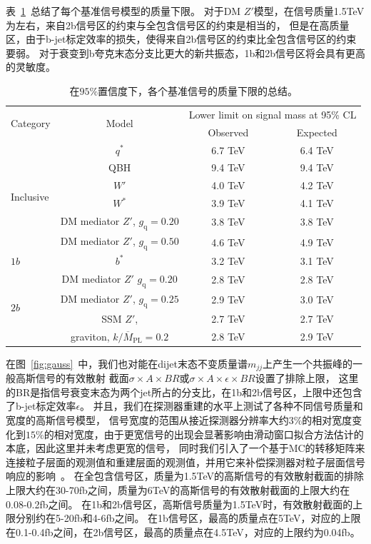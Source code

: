 表~\ref{tab:limits}~总结了每个基准信号模型的质量下限。
对于DM $Z'$模型，在信号质量1.5TeV为左右，来自2b信号区的约束与全包含信号区的约束是相当的，
但是在高质量区，由于b-jet标定效率的损失，使得来自2b信号区的约束比全包含信号区的约束要弱。
对于衰变到b夸克末态分支比更大的新共振态，1b和2b信号区将会具有更高的灵敏度。


\begin{table}[htbp]
  \caption{ 在$95\%$置信度下，各个基准信号的质量下限的总结。}
  \centering
  \begin{tabular}{l|c|c|c}
    \hline\hline
    \multirow{2}{*}{Category} & \multirow{2}{*}{Model} & \multicolumn{2}{c}{Lower limit on signal mass at 95\% CL} \\ 
    & & Observed & Expected \\\hline
    \multirow{6}{*}{Inclusive} & $q^*$ & 6.7 TeV & 6.4 TeV  \\
    & QBH & 9.4 TeV  & 9.4 TeV \\
    & $W'$ & 4.0 TeV & 4.2 TeV  \\
    & $W^*$   & 3.9 TeV & 4.1 TeV \\
    & DM mediator $Z'$, $g_\text{q}=0.20$ & 3.8 TeV & 3.8 TeV \\
    & DM mediator $Z'$, $g_\text{q}=0.50$ & 4.6 TeV & 4.9 TeV \\\hline
    $1b$ & $b^*$ & 3.2 TeV & 3.1 TeV \\\hline
    \multirow{4}{*}{$2b$} & DM mediator $Z'$ $g_\text{q}=0.20$ & 2.8 TeV  & 2.8 TeV \\
    & DM mediator $Z'$, $g_\text{q}=0.25$ & 2.9 TeV  & 3.0 TeV \\
    & SSM $Z'$, & 2.7 TeV & 2.7 TeV \\
    & graviton, $k/\overline{M}_\text{PL}=0.2$ & 2.8 TeV & 2.9 TeV \\\hline\hline
  \end{tabular}
  \label{tab:limits}
\end{table}


在图~\ref{fig:gauss}~中，我们也对能在dijet末态不变质量谱$m_{jj}$上产生一个共振峰的一般高斯信号的有效散射
截面$\sigma\times A \times BR$或$\sigma\times A \times \epsilon \times BR$设置了排除上限，
这里的BR是指信号衰变末态为两个jet所占的分支比，在1b和2b信号区，上限中还包含了b-jet标定效率$\epsilon$。
并且，我们在探测器重建的水平上测试了各种不同信号质量和宽度的高斯信号模型，
信号宽度的范围从接近探测器分辨率大约$3\%$的相对宽度变化到$15\%$的相对宽度，由于更宽信号的出现会显著影响由滑动窗口拟合方法估计的本底，因此这里并未考虑更宽的信号，
同时我们引入了一个基于MC的转移矩阵来连接粒子层面的观测值和重建层面的观测值，并用它来补偿探测器对粒子层面信号响应的影响~\cite{EXOT-2016-21}。
在全包含信号区，质量为1.5TeV的高斯信号的有效散射截面的排除上限大约在30-70fb之间，质量为6TeV的高斯信号的有效散射截面的上限大约在0.08-0.2fb之间。
在1b和2b信号区，高斯信号质量为1.5TeV时，有效散射截面的上限分别约在5-20fb和4-6fb之间。
在1b信号区，最高的质量点在5TeV，对应的上限在0.1-0.4fb之间，在2b信号区，最高的质量点在4.5TeV，对应的上限约为0.04fb。



